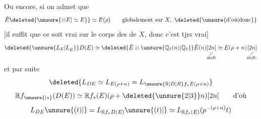 Ou encore, si on admet que
\[
 \check E\deleted{\unsure{\otimes E|\simeq E}}\simeq E(\rho)
 \qquad \text{globalement sur }X,\ \text{\deleted{\unsure{d'où|donc}}}
\]
[il suffit que ce soit vrai sur le corps des  de $X$, donc c'est  tjrs vrai]
\[
 \deleted{\unsure{L_E|L_{\check E}}}D(E)\simeq
 \deleted{\check E\otimes\unsure{\mathbb Q_\ell(n)|\mathbb Q_\ell}}
 \check E(n)\underset{\substack{\diagup\\\text{shift}}}{[2n]}
 \simeq E(\rho+n)\underset{\substack{\diagup\\\text{shift.}}}{[2n]}
\]
et par suite
\[
 \deleted{L_{DE}\simeq L_{E(\rho+n)}=
 L_{\unsure{\mathbb R|D|R}f_* E(\rho+n)}}
\]
\[
 \mathbb R f_{\unsure{{}|*}}(D(E))\simeq
 \mathbb R f_*(E)(\rho+\deleted{\unsure{2|3}}n)[2n]\qquad \text{d'où}
\]
\[
 L_{DE}\unsure{(t)|{}}=L_{\mathbb R f_*D(E)}\unsure{(t)|{}}
 \simeq L_{\mathbb R f_*(E)}(p^{-(\rho+n)}t)
\]

